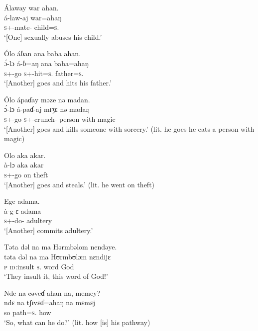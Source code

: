 \ea Álaway  war  ahan.\\
 \gll á-law-aj      war=ahaŋ\\
 \textsc{s}+{\IFV}-mate{}-{\CL}  child=\textsc{s}.{\POSS}\\
 \glt ‘[One] sexually abuses his child.’
 \z

\ea  Ólo  áɓan  ana  baba  ahan.\\ 
 \gll \'ɔ-lɔ     á-ɓ=aŋ   ana  baba=ahaŋ\\
 \textsc{s}+{\IFV}-go  \textsc{s}+{\IFV}-hit=\textsc{s}.{\IO}  {\DAT}       father=\textsc{s}.{\POSS}\\
 \glt ‘[Another] goes and hits his father.’ 
 \z

\ea Ólo  ápaɗay  məze  nə  madan. \\
 \gll \'ɔ{}-lɔ     á-paɗ-aj       mɪʒɛ   nə   madaŋ\\
 \textsc{s}+{\IFV}-go  \textsc{s}+{\IFV}-crunch{}-{\CL}  person  with  magic  \\
 \glt ‘[Another] goes and kills someone with sorcery.’ (lit. he goes he eats a person with magic)
 \z

\ea Olo  aka  akar.\\
 \gll à-lɔ         aka   akar\\
 \textsc{s}+{\PFV}-go   on  theft  \\
 \glt ‘[Another] goes and steals.’ (lit. he went on theft)
 \z

\ea Ege  adama.\\
 \gll à-g-ɛ     adama\\
 \textsc{s}+{\PFV}-do-{\CL}  adultery\\
 \glt ‘[Another] commits adultery.’ 
 \z

\ea Təta  dəl  na  ma  Hərmbəlom  nendəye.\\
 \gll təta   dəl     na   ma   Hʊrmbʊlɔm   nɛndijɛ\\
 \textsc{p}    \textsc{id}:insult    \textsc{s}.{\DO}  word  God    {\DEM}\\
 \glt ‘They insult it, this word of God!’
 \z

\ea Nde na  cəveɗ  ahan  na,  memey?\\
 \gll ndɛ  na   tʃɪvɛɗ=ahaŋ     na   mɛmɛj\\
 so  {\PSP}  path=\textsc{s}.{\POSS}  {\PSP}  how\\
 \glt ‘So, what can he do?’ (lit. how [is] his pathway)
 \z

